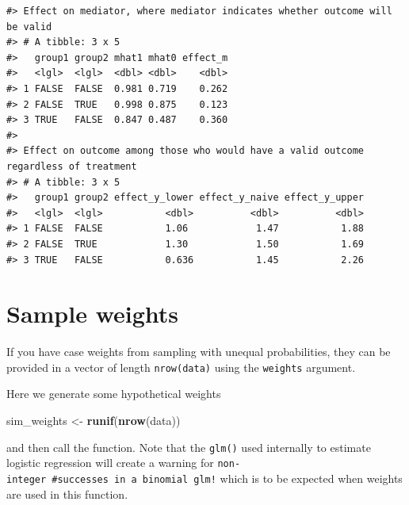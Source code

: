 \documentclass[
]{book}
\newenvironment{Shaded}{\begin{snugshade}}{\end{snugshade}}
\newcommand{\AttributeTok}[1]{\textcolor[rgb]{0.13,0.29,0.53}{#1}}
\newcommand{\CommentTok}[1]{\textcolor[rgb]{0.56,0.35,0.01}{\textit{#1}}}
\newcommand{\FunctionTok}[1]{\textcolor[rgb]{0.13,0.29,0.53}{\textbf{#1}}}
\newcommand{\NormalTok}[1]{#1}
\newcommand{\OtherTok}[1]{\textcolor[rgb]{0.56,0.35,0.01}{#1}}
\newcommand{\SpecialCharTok}[1]{\textcolor[rgb]{0.81,0.36,0.00}{\textbf{#1}}}
\newcommand{\StringTok}[1]{\textcolor[rgb]{0.31,0.60,0.02}{#1}}
\begin{document}
\begin{verbatim}
#> Effect on mediator, where mediator indicates whether outcome will be valid
#> # A tibble: 3 x 5
#>   group1 group2 mhat1 mhat0 effect_m
#>   <lgl>  <lgl>  <dbl> <dbl>    <dbl>
#> 1 FALSE  FALSE  0.981 0.719    0.262
#> 2 FALSE  TRUE   0.998 0.875    0.123
#> 3 TRUE   FALSE  0.847 0.487    0.360
#> 
#> Effect on outcome among those who would have a valid outcome regardless of treatment
#> # A tibble: 3 x 5
#>   group1 group2 effect_y_lower effect_y_naive effect_y_upper
#>   <lgl>  <lgl>           <dbl>          <dbl>          <dbl>
#> 1 FALSE  FALSE           1.06            1.47           1.88
#> 2 FALSE  TRUE            1.30            1.50           1.69
#> 3 TRUE   FALSE           0.636           1.45           2.26
\end{verbatim}

\hypertarget{sample-weights}{%
\section{Sample weights}\label{sample-weights}}

If you have case weights from sampling with unequal probabilities, they can be provided in a vector of length \texttt{nrow(data)} using the \texttt{weights} argument.

Here we generate some hypothetical weights

\begin{Shaded}
\begin{Highlighting}[]
\NormalTok{sim\_weights }\OtherTok{\textless{}{-}} \FunctionTok{runif}\NormalTok{(}\FunctionTok{nrow}\NormalTok{(data))}
\end{Highlighting}
\end{Shaded}

and then call the function. Note that the \texttt{glm()} used internally to estimate logistic regression will create a warning for \texttt{non-integer\ \#successes\ in\ a\ binomial\ glm!} which is to be expected when weights are used in this function.

\begin{Shaded}
\end{Shaded}
\end{document}
